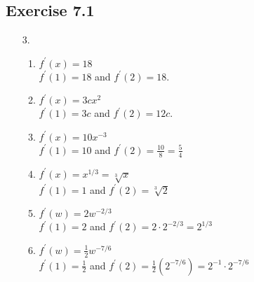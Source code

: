 \documentclass{./../../Latex/homework}
\begin{document}
\subsection*{Exercise 7.1} 
\begin{enumerate}

\item[3.]

\begin{enumerate}
	 
\item $f^{\prime}(x)=18$ \\
$f^{\prime}(1)=18$ and $f^{\prime}(2)=18$. \\

\item  $f^{\prime}(x)=3 c x^{2}$ \\
$f^{\prime}(1)=3 c$ and $f^{\prime}(2)=12 c$.\\

\item  $f^{\prime}(x)=10 x^{-3}$ \\
$f^{\prime}(1)=10$ and $f^{\prime}(2)=\frac{10}{8} = \frac{5}{4}$ \\

\item $f^{\prime}(x)=x^{1 / 3}=\sqrt[3]{x}$ \\
$f^{\prime}(1)=1$ and $f^{\prime}(2)=\sqrt[3]{2}$ \\

\item $f^{\prime}(w)=2 w^{-2 / 3}$ \\
$f^{\prime}(1)=2$ and $f^{\prime}(2)=2 \cdot 2^{-2 / 3}=2^{1 / 3}$ \\

\item  $f^{\prime}(w)=\frac{1}{2} w^{-7 / 6}$ \\
$f^{\prime}(1)=\frac{1}{2}$ and $f^{\prime}(2)=\frac{1}{2}\left(2^{-7 / 6}\right)=2^{-1} \cdot 2^{-7 / 6}$ \\
\end{enumerate}
\end{enumerate}
\end{document}
